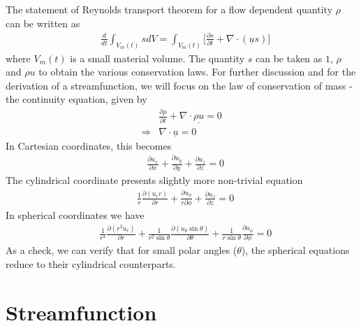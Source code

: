 \documentclass[11pt,a4paper]{article}
\newcommand{\pd}[2]{\frac{\partial #1}{\partial #2}}
\newcommand{\vect}[1]{\underline{#1}}
\newcommand{\1}{\vect{1}}
\newcommand{\grad}{\nabla}
\newcommand{\RA}{\Rightarrow}
\newcommand{\divg}[1]{\grad\cdot\vect{#1}}
\newcommand{\vu}{\vect{u}}
\begin{document}
The statement of Reynolds transport theorem for a flow dependent quantity $\rho$ can be written as
\begin{align*}
&\frac{d}{dt}\int_{V_m(t)} s dV= \int_{V_m(t)}\bigg[ \pd{s}{t}+\grad\cdot(\vu s)\bigg]
\end{align*}
where $V_m(t)$ is a small material volume. The quantity $s$ can be taken as $1$, $\rho$ and $\rho u$ to obtain the various conservation laws. For further discussion and for the derivation of a streamfunction,  we will focus on the law of conservation of mass - the continuity equation, given by
\begin{align*}
& \pd{\rho}{t} + \divg {\rho u} = 0\\
\RA& \divg u = 0 \tag{if $\rho$ is a constant}
\end{align*}
In Cartesian coordinates, this becomes
\begin{align*}
&\pd{u_x}{x} + \pd{u_y}{y}+ \pd{u_z}{z} = 0
\end{align*}
The cylindrical coordinate presents slightly more non-trivial equation
\begin{align*}
&\frac{1}{r}\pd{(u_r r)}{r} + \frac{\partial u_\phi}{r\partial\phi} + \pd{u_z}{z} = 0
\end{align*}
In spherical coordinates we have
\begin{align*}
&\frac{1}{r^2}\pd{(r^2 u_r)}{r} + \frac{1}{r^2\sin\theta}\pd{(u_\theta\sin\theta)}{\theta} + \frac{1}{r\sin\theta}\pd{u_\phi}{\phi} = 0
\end{align*}
As a check, we can verify that for small polar angles ($\theta$), the spherical equations reduce to their cylindrical counterparts.


\section{Streamfunction}
\end{document}
